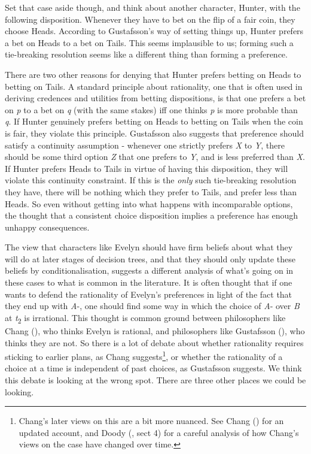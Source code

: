 \documentclass[
  11pt,
  letterpaper,
  DIV=11,
  numbers=noendperiod,
  twoside]{scrartcl}
\begin{document}
Set that case aside though, and think about another character, Hunter,
with the following disposition. Whenever they have to bet on the flip of
a fair coin, they choose Heads. According to Gustafsson's way of setting
things up, Hunter prefers a bet on Heads to a bet on Tails. This seems
implausible to us; forming such a tie-breaking resolution seems like a
different thing than forming a preference.

There are two other reasons for denying that Hunter prefers betting on
Heads to betting on Tails. A standard principle about rationality, one
that is often used in deriving credences and utilities from betting
dispositions, is that one prefers a bet on \emph{p} to a bet on \emph{q}
(with the same stakes) iff one thinks \emph{p} is more probable than
\emph{q}. If Hunter genuinely prefers betting on Heads to betting on
Tails when the coin is fair, they violate this principle. Gustafsson
also suggests that preference should satisfy a continuity assumption -
whenever one strictly prefers \emph{X} to \emph{Y}, there should be some
third option \emph{Z} that one prefers to \emph{Y}, and is less
preferred than \emph{X}. If Hunter prefers Heads to Tails in virtue of
having this disposition, they will violate this continuity constraint.
If this is the \emph{only} such tie-breaking resolution they have, there
will be nothing which they prefer to Tails, and prefer less than Heads.
So even without getting into what happens with incomparable options, the
thought that a consistent choice disposition implies a preference has
enough unhappy consequences.

The view that characters like Evelyn should have firm beliefs about what
they will do at later stages of decision trees, and that they should
only update these beliefs by conditionalisation, suggests a different
analysis of what's going on in these cases to what is common in the
literature. It is often thought that if one wants to defend the
rationality of Evelyn's preferences in light of the fact that they end
up with \emph{A}-, one should find some way in which the choice of
\emph{A}- over \emph{B} at \emph{t}\textsubscript{2} is irrational. This
thought is common ground between philosophers like Chang
(), who thinks Evelyn is rational, and
philosophers like Gustafsson (), who
thinks they are not. So there is a lot of debate about whether
rationality requires sticking to earlier plans, as Chang
suggests\footnote{Chang's later views on this are a bit more nuanced.
  See Chang () for an updated account, and
  Doody (, sect 4) for a careful analysis
  of how Chang's views on the case have changed over time.}, or whether
the rationality of a choice at a time is independent of past choices, as
Gustafsson suggests. We think this debate is looking at the wrong spot.
There are three other places we could be looking.
\end{document}
